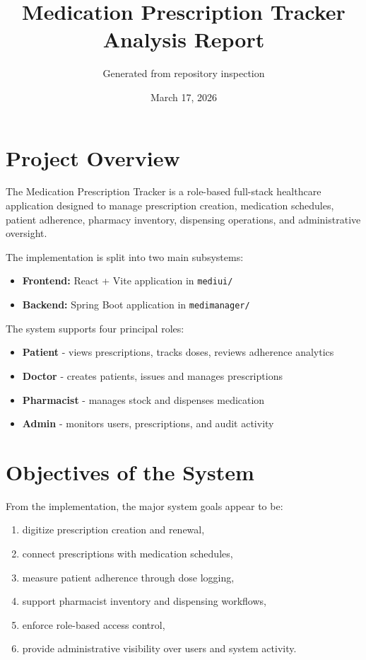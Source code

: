 \documentclass[12pt,a4paper]{article}
\title{Medication Prescription Tracker\\Analysis Report}
\author{Generated from repository inspection}
\date{March 17, 2026}
\begin{document}
\maketitle
\tableofcontents
\newpage

\section{Project Overview}
The Medication Prescription Tracker is a role-based full-stack healthcare application designed to manage prescription creation, medication schedules, patient adherence, pharmacy inventory, dispensing operations, and administrative oversight.

The implementation is split into two main subsystems:
\begin{itemize}[leftmargin=*]
  \item \textbf{Frontend:} React + Vite application in \texttt{mediui/}
  \item \textbf{Backend:} Spring Boot application in \texttt{medimanager/}
\end{itemize}

The system supports four principal roles:
\begin{itemize}[leftmargin=*]
  \item \textbf{Patient} - views prescriptions, tracks doses, reviews adherence analytics
  \item \textbf{Doctor} - creates patients, issues and manages prescriptions
  \item \textbf{Pharmacist} - manages stock and dispenses medication
  \item \textbf{Admin} - monitors users, prescriptions, and audit activity
\end{itemize}

\section{Objectives of the System}
From the implementation, the major system goals appear to be:
\begin{enumerate}[leftmargin=*]
  \item digitize prescription creation and renewal,
  \item connect prescriptions with medication schedules,
  \item measure patient adherence through dose logging,
  \item support pharmacist inventory and dispensing workflows,
  \item enforce role-based access control,
  \item provide administrative visibility over users and system activity.
\end{enumerate}
\end{document}
